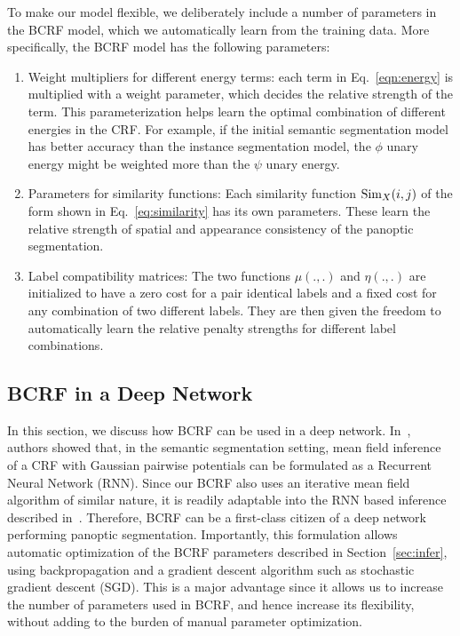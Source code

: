 To make our model flexible, we deliberately include a number of parameters in the BCRF model, which we automatically learn from the training data. More specifically, the BCRF model has the following parameters:
\begin{enumerate}
	\item Weight multipliers for different energy terms: each term in Eq.~\eqref{eqn:energy} is multiplied with a weight parameter, which decides the relative strength of the term. This parameterization helps learn the optimal combination of different energies in the CRF. For example, if the initial semantic segmentation model has better accuracy than the instance segmentation model, the $\phi$ unary energy might be weighted more than the $\psi$ unary energy.
	
	\item Parameters for similarity functions: Each similarity function $\operatorname{Sim}_X(i, j)$ of the form shown in Eq.~\eqref{eq:similarity} has its own parameters. These learn the relative strength of spatial and appearance consistency of the panoptic segmentation.
	
	\item Label compatibility matrices: The two functions $\mu(., .)$ and $\eta(., .)$ are initialized to have a zero cost for a pair identical labels and a fixed cost for any combination of two different labels. They are then given the freedom to automatically learn the relative penalty strengths for different label combinations.
\end{enumerate}


\subsection{BCRF in a Deep Network}
In this section, we discuss how BCRF can be used in a deep network. In~\cite{Zhen_ICCV15_CRFRNN}, authors showed that, in the semantic segmentation setting, mean field inference of a CRF with Gaussian pairwise potentials can be formulated as a Recurrent Neural Network (RNN). Since our BCRF also uses an iterative mean field algorithm of similar nature, it is readily adaptable into the RNN based inference described in~\cite{Zhen_ICCV15_CRFRNN}. Therefore, BCRF can be a first-class citizen of a deep network performing panoptic segmentation. Importantly, this formulation allows automatic optimization of the BCRF parameters described in Section~\ref{sec:infer}, using backpropagation and a gradient descent algorithm such as stochastic gradient descent (SGD). This is a major advantage since it allows us to increase the number of parameters used in BCRF, and hence increase its flexibility, without adding to the burden of manual parameter optimization.

